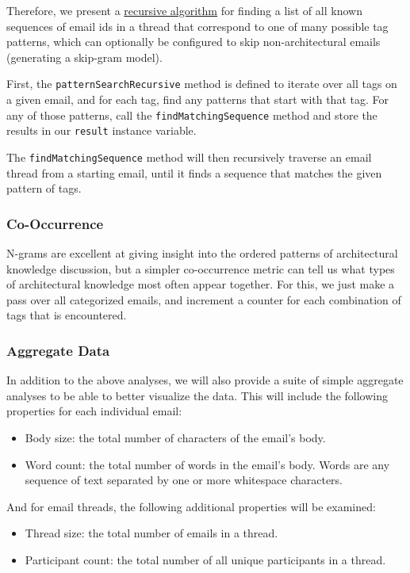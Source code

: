 \documentclass[a4paper, 12pt]{article}
\begin{document}
			Therefore, we present a \hyperref[sec:pattern-algorithm]{recursive algorithm} for finding a list of all known sequences of email ids in a thread that correspond to one of many possible tag patterns, which can optionally be configured to skip non-architectural emails (generating a skip-gram model).
			
			First, the \texttt{patternSearchRecursive} method is defined to iterate over all tags on a given email, and for each tag, find any patterns that start with that tag. For any of those patterns, call the \texttt{findMatchingSequence} method and store the results in our \texttt{result} instance variable.
			
			The \texttt{findMatchingSequence} method will then recursively traverse an email thread from a starting email, until it finds a sequence that matches the given pattern of tags.
			
		\subsubsection{Co-Occurrence}
			N-grams are excellent at giving insight into the ordered patterns of architectural knowledge discussion, but a simpler co-occurrence metric can tell us what types of architectural knowledge most often appear together. For this, we just make a pass over all categorized emails, and increment a counter for each combination of tags that is encountered.
			
		\subsubsection{Aggregate Data}
			In addition to the above analyses, we will also provide a suite of simple aggregate analyses to be able to better visualize the data. This will include the following properties for each individual email:
			
			\begin{itemize}
				\item Body size: the total number of characters of the email's body.
				\item Word count: the total number of words in the email's body. Words are any sequence of text separated by one or more whitespace characters.
			\end{itemize}
		
			And for email threads, the following additional properties will be examined:
			
			\begin{itemize}
				\item Thread size: the total number of emails in a thread.
				\item Participant count: the total number of all unique participants in a thread.
			\end{itemize}
\end{document}
